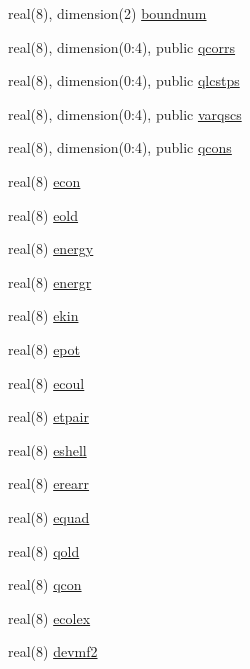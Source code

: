 \begin{DoxyCompactItemize}
real(8), dimension(2) \hyperlink{namespaceobserv_aa4177808cf29e88750de09e971052d7c}{boundnum}
\item 
real(8), dimension(0\+:4), public \hyperlink{namespaceobserv_a16d0b249b06168c260b7a7752729f60a}{qcorrs}
\item 
real(8), dimension(0\+:4), public \hyperlink{namespaceobserv_a6a9c12cdfb362e6d2af583d7eb17d32f}{qlcstps}
\item 
real(8), dimension(0\+:4), public \hyperlink{namespaceobserv_afbab940fd904214e88cead4570ed5a45}{varqscs}
\item 
real(8), dimension(0\+:4), public \hyperlink{namespaceobserv_aa5526a16e8f0982dec32b788e8c13eae}{qcons}
\item 
real(8) \hyperlink{namespaceobserv_aab2b361228c2be9aacc647898d20602c}{econ}
\item 
real(8) \hyperlink{namespaceobserv_a1988e691b9c7e5f98cb2e13a4a229908}{eold}
\item 
real(8) \hyperlink{namespaceobserv_a49a7e3ba548450307b3a2c22ace8b3f3}{energy}
\item 
real(8) \hyperlink{namespaceobserv_a8e556cf28d2d577177523975fb47467b}{energr}
\item 
real(8) \hyperlink{namespaceobserv_a7df2eeed60a05d3f29ca04013bba2081}{ekin}
\item 
real(8) \hyperlink{namespaceobserv_a87e633bdcc50c87ba74f4f69c97c8534}{epot}
\item 
real(8) \hyperlink{namespaceobserv_ac0a63f15b5c3dd97c7869b7748679212}{ecoul}
\item 
real(8) \hyperlink{namespaceobserv_ac535470bfdf0cb2be9051d1ad7f2b4bf}{etpair}
\item 
real(8) \hyperlink{namespaceobserv_ac8fdfe12d0195f54b5270f0787d8a4be}{eshell}
\item 
real(8) \hyperlink{namespaceobserv_aadc4a7afed808cde5967554c7cf067d6}{erearr}
\item 
real(8) \hyperlink{namespaceobserv_ab70baa891e5608be4ea8c1a24c762d12}{equad}
\item 
real(8) \hyperlink{namespaceobserv_a8aaf442bc6b6a3d7ef38d939c0819e99}{qold}
\item 
real(8) \hyperlink{namespaceobserv_a2b56c807c1301829c79e6f061ac78297}{qcon}
\item 
real(8) \hyperlink{namespaceobserv_a6331b57c0ae11428cdfa449797aa09d2}{ecolex}
\item 
real(8) \hyperlink{namespaceobserv_aca69c157018bf487e453d1813641ba01}{devmf2}
\item 

\end{DoxyCompactItemize}
